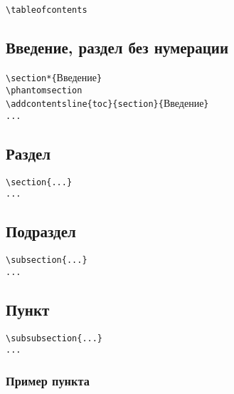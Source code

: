 \documentclass[14pt, a4paper, titlepage]{extarticle}
\renewcommand{\thesection}{\Asbuk{section}}
\let\oldsec\section
\renewcommand{\section}{
        \clearpage
        \phantomsection
        \refstepcounter{section}
        \addcontentsline{toc}{section}{\appendixname~\thesection}
        \oldsec*} %
\begin{document}
\begin{verbatim}
\tableofcontents
\end{verbatim}

\subsection{Введение, раздел без нумерации}

\noindent\verb"\section*{"Введение\verb"}"\\
\verb"\phantomsection"\\
\verb"\addcontentsline{toc}{section}{"Введение\verb"}"\\
\verb"..."

\subsection{Раздел}

\begin{verbatim}
\section{...}
...
\end{verbatim}

\subsection{Подраздел}

\begin{verbatim}
\subsection{...}
...
\end{verbatim}

\subsection{Пункт}

\begin{verbatim}
\subsubsection{...}
...
\end{verbatim}

\subsubsection{Пример пункта}
\end{document}
